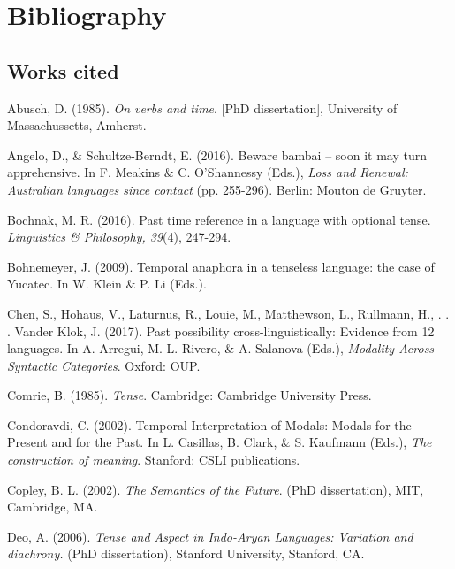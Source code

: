 \documentclass[12pt]{article}
\newcommand{\mcom}[1]
 {\marginpar{\raggedleft\raggedright\hspace{0pt}\linespread{0.9}\footnotesize{#1}}}
\renewcommand{\mcom}[1]{}
\begin{document}
\justifying


\setcounter{secnumdepth}{0} 
\vfill\section{Bibliography}%
\subsection{Works cited}

\small\begin{hangparas}{3em}{1}

Abusch, D. (1985). \textit{On verbs and time}. [PhD dissertation], University of Massachussetts, Amherst.   


Angelo, D., \& Schultze-Berndt, E. (2016). Beware bambai – soon it may turn apprehensive. In F. Meakins \& C. O'Shannessy (Eds.), \textit{Loss and Renewal: Australian languages since contact} (pp. 255-296). Berlin: Mouton de Gruyter.

Bochnak, M. R. (2016). Past time reference in a language with optional tense. \textit{Linguistics \& Philosophy, 39}(4), 247-294. 

Bohnemeyer, J. (2009). Temporal anaphora in a tenseless language: the case of Yucatec. In W. Klein \& P. Li (Eds.).


Chen, S., Hohaus, V., Laturnus, R., Louie, M., Matthewson, L., Rullmann, H., . . . Vander Klok, J. (2017). Past possibility cross-linguistically: Evidence from 12 languages. In A. Arregui, M.-L. Rivero, \& A. Salanova (Eds.),\textit{ Modality Across Syntactic Categories}. Oxford: OUP.


Comrie, B. (1985). \textit{Tense}. Cambridge: Cambridge University Press.



Condoravdi, C. (2002). Temporal Interpretation of Modals: Modals for the Present and for the Past. In L. Casillas, B. Clark, \& S. Kaufmann (Eds.), \textit{The construction of meaning}. Stanford: CSLI publications.


Copley, B. L. (2002). \textit{The Semantics of the Future}. (PhD dissertation), MIT, Cambridge, MA.   

Deo, A. (2006). \textit{Tense and Aspect in Indo-Aryan Languages: Variation and diachrony.} (PhD dissertation), Stanford University, Stanford, CA.   


\end{hangparas}
\end{document}
